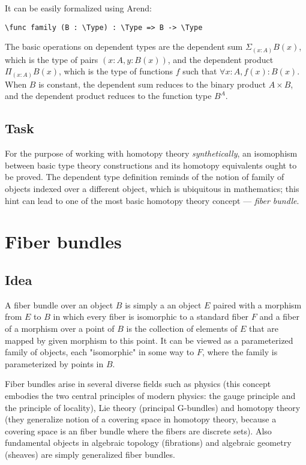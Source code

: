 It can be easily formalized using Arend:

\begin{ListingEnv}[H]
\begin{lstlisting}
\func family (B : \Type) : \Type => B -> \Type
\end{lstlisting}
\end{ListingEnv}

The basic operations on dependent types are the dependent sum $\Sigma_{(x : A)}B(x)$, which is the type of pairs $(x:A, y:B(x))$, and the dependent product $\Pi_{(x : A)}B(x)$, which is the type of functions $f$ such that $\forall x:A, f(x):B(x)$. When $B$ is constant, the dependent sum reduces to the binary product $A \times B$, and the dependent product reduces to the function type $B^A$.

\subsection{Task}

For the purpose of working with homotopy theory \textit{synthetically}, an isomophism between basic type theory constructions and its homotopy equivalents ought to be proved. The dependent type definition reminds of the notion of family of objects indexed over a different object, which is ubiquitous in mathematics; this hint can lead to one of the most basic homotopy theory concept --- \textit{fiber bundle}.

\section{Fiber bundles}
\label{sec:fiberbundles}

\subsection{Idea}
A fiber bundle over an object $B$ is simply a an object $E$ paired with a morphism from $E$ to $B$ in which every fiber is isomorphic to a standard fiber $F$ and a fiber of a morphism over a point of $B$ is the collection of elements of $E$ that are mapped by given morphism to this point. It can be viewed as a parameterized family of objects, each "isomorphic" in some way to $F$, where the family is parameterized by points in $B$.

Fiber bundles arise in several diverse fields such as physics (this concept embodies the two central principles of modern physics: the gauge principle and the principle of locality), Lie theory (principal G-bundles) and homotopy theory (they generalize notion of a covering space in homotopy theory, because a covering space is an fiber bundle where the fibers are discrete sets). Also fundamental objects in algebraic topology (fibrations) and algebraic geometry (sheaves) are simply generalized fiber bundles.

